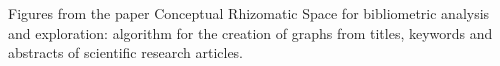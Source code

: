 Figures from the paper Conceptual Rhizomatic Space for bibliometric analysis and exploration: algorithm for the creation of graphs from titles, keywords and abstracts of scientific research articles.
